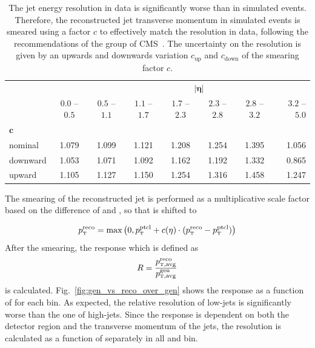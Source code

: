 \begin{table}[htbp]
\setlength\tabcolsep{4.5pt} 
    \centering
    \caption[Jet energy resolution scale factors]{
             The jet energy resolution in data is significantly worse than in
             simulated events. Therefore, the reconstructed jet transverse
             momentum in simulated events is smeared using a factor $c$ to
             effectively match the resolution in data, following the
             recommendations of the \JetMET group of CMS~\cite{jetmet:resolution}.
             The uncertainty on the resolution is given by an upwards and
             downwards variation $c_\mathrm{up}$ and
             $c_\mathrm{down}$ of the smearing factor $c$.}
    \label{tab:res_smearing}

    \begin{tabular}{lccccccr}
    \toprule
                        &                & \multicolumn{6}{c}{$\bm{|\eta|}$}\\\cmidrule{2-8}
                        & $0.0$ -- $0.5$ & $0.5$ -- $1.1$                                    & $1.1$ -- $1.7$   & $1.7$ --
               $2.3$    & $2.3$ -- $2.8$ & $2.8$ -- $3.2$                                    & $3.2$ -- $5.0$\\
               $\bm{c}$ &                &                                                   &                  &          &       &       & \\\cmidrule{1-1}
    nominal             & 1.079          & 1.099                                             & 1.121            & 1.208    & 1.254 & 1.395 & 1.056\\
    downward            & 1.053          & 1.071                                             & 1.092            & 1.162    & 1.192 & 1.332 & 0.865\\
    upward              & 1.105          & 1.127                                             & 1.150            & 1.254    & 1.316 & 1.458 & 1.247\\
    \bottomrule
    \end{tabular}
\end{table}

The smearing of the reconstructed jet \pt is performed as a multiplicative scale
factor based on the difference of \ptreco and \ptgen, so that \ptreco is shifted
to

\begin{equation}
\ptreco = \max \left( 0, \ptgen + c(\eta) \cdot (\ptreco - \ptgen) \right)
\end{equation}
%
After the smearing, the response which is defined as
%
\begin{equation}
    R = \frac{\ptavg^{\text{reco}}}{\ptavg^{\text{gen}}}
\end{equation}
%
is calculated. Fig.~\ref{fig:gen_vs_reco_over_gen} shows the response as a
function of \ptavggen for each bin. As expected, the relative resolution of low-\pt jets is
significantly worse than the one of high-\pt jets. Since the response is dependent
on both the detector region and the transverse momentum of the jets, the resolution
is calculated as a function of \ptavggen separately in all \ystar and \yboost
bin. 

